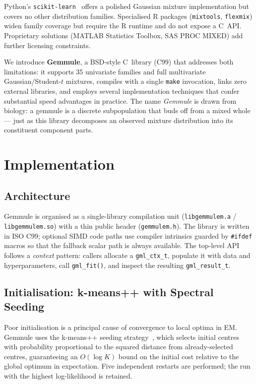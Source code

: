 ﻿\documentclass[10pt,twocolumn]{article}
\begin{document}
Python's \texttt{scikit-learn}~\citep{pedregosa2011scikit} offers a polished
Gaussian mixture implementation but covers no other distribution families.
Specialised R packages (\texttt{mixtools}, \texttt{flexmix}) widen family
coverage but require the R runtime and do not expose a C~API.
Proprietary solutions (MATLAB Statistics Toolbox, SAS PROC MIXED) add further
licensing constraints.

We introduce \textbf{Gemmule}, a BSD-style C~library (C99) that addresses
both limitations: it supports 35 univariate families and full
multivariate Gaussian/Student-$t$ mixtures, compiles with a single
\texttt{make} invocation, links zero external libraries, and employs
several implementation techniques that confer substantial speed advantages
in practice.
The name \emph{Gemmule} is drawn from biology: a gemmule is a discrete
subpopulation that buds off from a mixed whole --- just as this library
decomposes an observed mixture distribution into its constituent component parts.

\section{Implementation}

\subsection{Architecture}

Gemmule is organised as a single-library compilation unit
(\texttt{libgemmulem.a} / \texttt{libgemmulem.so}) with a thin public header
(\texttt{gemmulem.h}).
The library is written in ISO C99; optional SIMD code paths use compiler
intrinsics guarded by \texttt{\#ifdef} macros so that the fallback scalar
path is always available.
The top-level API follows a \emph{context} pattern: callers allocate a
\texttt{gml\_ctx\_t}, populate it with data and hyperparameters, call
\texttt{gml\_fit()}, and inspect the resulting \texttt{gml\_result\_t}.

\subsection{Initialisation: k-means++ with Spectral Seeding}

Poor initialisation is a principal cause of convergence to local optima in
EM.
Gemmule uses the k-means++ seeding strategy~\citep{arthur2007kmeans},
which selects initial centres with probability proportional to the squared
distance from already-selected centres, guaranteeing an $O(\log K)$ bound on
the initial cost relative to the global optimum in expectation.
Five independent restarts are performed; the run with the highest
log-likelihood is retained.
\end{document}
